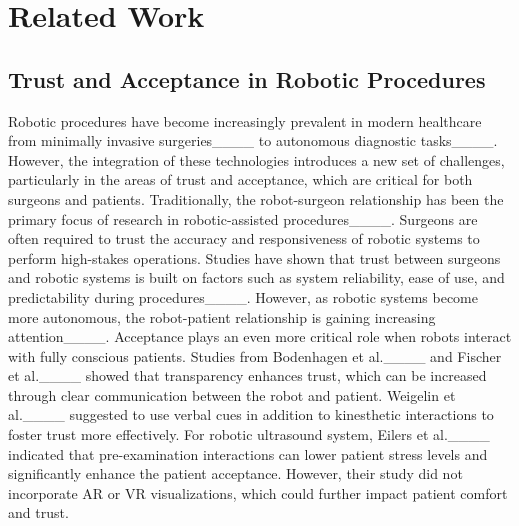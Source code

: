 \section{Related Work}
\label{sec:RelatedWork}

\subsection{Trust and Acceptance in Robotic Procedures}

Robotic procedures have become increasingly prevalent in modern healthcare from minimally invasive surgeries____ to autonomous diagnostic tasks____. However, the integration of these technologies introduces a new set of challenges, particularly in the areas of trust and acceptance, which are critical for both surgeons and patients.
Traditionally, the robot-surgeon relationship has been the primary focus of research in robotic-assisted procedures____. Surgeons are often required to trust the accuracy and responsiveness of robotic systems to perform high-stakes operations. Studies have shown that trust between surgeons and robotic systems is built on factors such as system reliability, ease of use, and predictability during procedures____. However, as robotic systems become more autonomous, the robot-patient relationship is gaining increasing attention____. Acceptance plays an even more critical role when robots interact with fully conscious patients. Studies from Bodenhagen et al.____ and Fischer et al.____ showed that transparency enhances trust, which can be increased through clear communication between the robot and patient. Weigelin et al.____ suggested to use verbal cues in addition to kinesthetic interactions to foster trust more effectively. For robotic ultrasound system, Eilers et al.____ indicated that pre-examination interactions can lower patient stress levels and significantly enhance the patient acceptance. However, their study did not incorporate AR or VR visualizations, which could further impact patient comfort and trust. 

